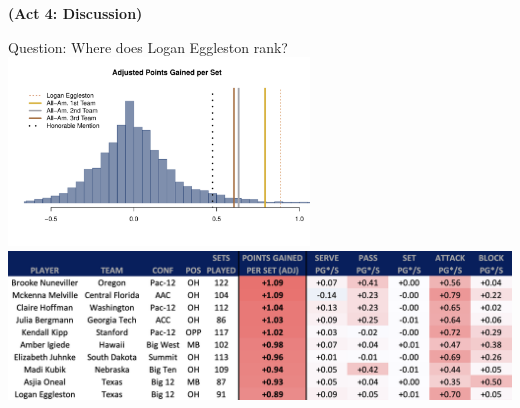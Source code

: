 \documentclass[handout]{beamer}
\begin{document}
\begin{frame}
  \centering
  \color{riceblue} \bf (Act 4: Discussion)\\
\end{frame}

\begin{frame}{Question: Where does Logan Eggleston rank?}
  \pause
  \centering
  \includegraphics[width = 0.6\textwidth]{images/avca_all_americans_adj.pdf}\\
  \includegraphics[width = \textwidth]{images/top_ten_players.png}
\end{frame}
\end{document}
